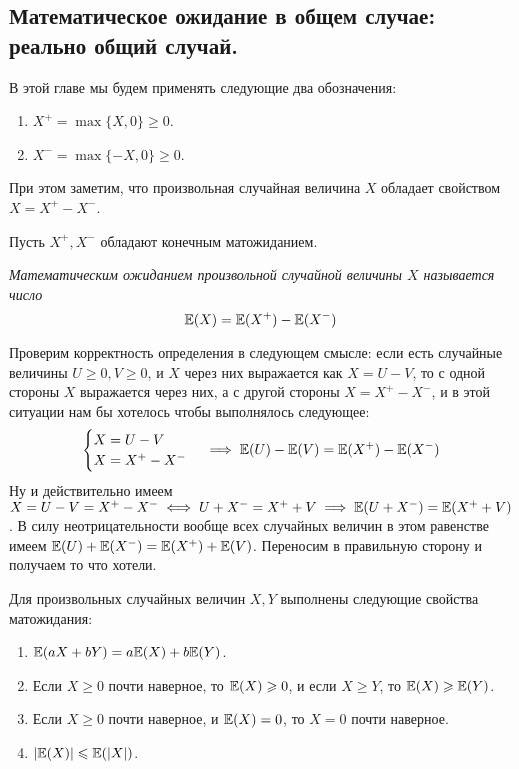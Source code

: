 \subsection{Математическое ожидание в общем случае: реально общий случай.}
\begin{designation}
    В этой главе мы будем применять следующие два обозначения:
    \begin{enumerate}
        \item $X^+ = \max\{X, 0\} \geq 0$.
        \item $X^- = \max\{-X, 0\} \geq 0$.
    \end{enumerate}
    При этом заметим, что произвольная случайная величина $X$ обладает свойством $X = X^+ - X^-$.
\end{designation}
Пусть $X^+, X^-$ обладают конечным матожиданием.
\begin{definition}
    \it{Математическим ожиданием} произвольной случайной величины $X$ называется число
    \[
        \mathbb{E}(X) = \mathbb{E}(X^+) - \mathbb{E}(X^-)
    \]
\end{definition}
Проверим корректность определения в следующем смысле: если есть случайные величины $U \geq 0, V \geq 0$, и $X$ через них выражается
как $X = U - V$, то с одной стороны $X$ выражается через них, а с другой стороны $X = X^+ - X^-$, и в этой ситуации нам бы
хотелось чтобы выполнялось следующее:
\[
    \begin{cases}
        X = U - V\\
        X = X^+ - X^-
    \end{cases}
    \implies
    \mathbb{E}(U) - \mathbb{E}(V) = \mathbb{E}(X^+) - \mathbb{E}(X^-)
\]
Ну и действительно имеем $X = U - V = X^+ - X^- \iff U + X^- = X^+ + V \implies \mathbb{E}(U + X^-) = \mathbb{E}(X^+ + V)$. В силу неотрицательности
вообще всех случайных величин в этом равенстве имеем $\mathbb{E}(U) + \mathbb{E}(X^-) = \mathbb{E}(X^+) + \mathbb{E}(V)$. Переносим в правильную сторону
и получаем то что хотели.
\begin{proposal}
    Для произвольных случайных величин $X, Y$ выполнены следующие свойства матожидания:
    \begin{enumerate}
        \item $\mathbb{E}(aX + bY) = a\mathbb{E}(X) + b\mathbb{E}(Y)$.
        \item Если $X \geq 0$ почти наверное, то $\mathbb{E}(X) \geqslant 0$, и если $X \geq Y$, то $\mathbb{E}(X) \geqslant \mathbb{E}(Y)$.
        \item Если $X \geq 0$ почти наверное, и $\mathbb{E}(X) = 0$, то $X = 0$ почти наверное.
        \item $|\mathbb{E}(X)| \leqslant \mathbb{E}(|X|)$.
    \end{enumerate}
\end{proposal}
